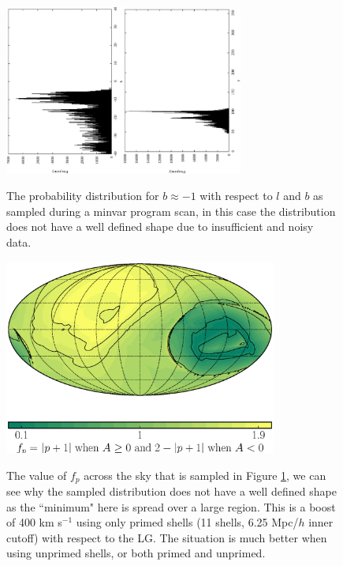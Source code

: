 \documentclass[11pt]{article}
\begin{document}
\begin{figure}
\includegraphics[width=0.35\textwidth,angle=-90]{hist_b_bad.eps}\includegraphics[width=0.35\textwidth,angle=-90]{hist_l_bad.eps}\label{fig:hist_bad}
\caption{The probability distribution for $b\approx-1$ with respect to $l$ and $b$ as sampled during a minvar program scan, in this case the distribution does not have a well defined shape due to insufficient and noisy data.}
\end{figure}

\begin{figure}
\centering
\includegraphics[width=0.8\textwidth]{Figure_7_bad.eps}\label{fig:skymap}
\caption{The value of $f_p$ across the sky that is sampled in Figure \ref{fig:hist_bad}, we can see why the sampled distribution does not have a well defined shape as the ``minimum" here is spread over a large region.  This is a boost of 400 km s$^{-1}$ using only primed shells (11 shells, 6.25 Mpc/$h$ inner cutoff) with respect to the LG.  The situation is much better when using unprimed shells, or both primed and unprimed.}
\end{figure}
\end{document}
